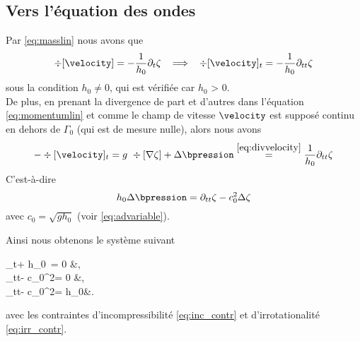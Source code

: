 \subsection{Vers l'équation des ondes}\label{subsec:eqtondes}
\noindent Par \eqref{eq:masslin} nous avons que
\begin{equation}
\div[\velocity]= -\frac{1}{h_0}\partial_t\zeta\hspace{3mm}\Longrightarrow\hspace{3mm} \div[\velocity]_t = -\frac{1}{h_0}\partial_{tt}\zeta\label{eq:divvelocity}
\end{equation}
sous la condition $h_0 \neq 0$, qui est vérifiée car $h_0$ > 0.\\
De plus, en prenant la divergence de part et d'autres dans l'équation \eqref{eq:momentumlin} et comme le champ de vitesse $\velocity$ est supposé continu en dehors de $\Gamma_0$ (qui est de mesure nulle), alors nous avons
\begin{equation*}
-\div[\velocity]_t = g~\div[\nabla\zeta] +\Delta\bpression \overset{\eqref{eq:divvelocity}}{=} \frac{1}{h_0}\partial_{tt}\zeta
\end{equation*}
C'est-à-dire
\begin{equation}
h_0 \Delta \bpression = \partial_{tt}\zeta - c_0^2\Delta\zeta
\end{equation}
avec $c_0 = \sqrt{gh_0}$ (voir \eqref{eq:advariable}).
\begin{refe}
	Ainsi nous obtenons le système suivant
	\begin{subnumcases}{}
		\partial_t\zeta + h_0~\div[\velocity] = 0 &,\label{eq:zetamass}\\
		\partial_{tt}\zeta - c_0^2\Delta\zeta = 0 &,\label{eq:zetaonde_w}\\
		\partial_{tt}\zeta - c_0^2\Delta\zeta = h_0\Delta\bpression &.\label{eq:zetaonde_b}
	\end{subnumcases}
	avec les contraintes d'incompressibilité \eqref{eq:inc_contr} et d'irrotationalité \eqref{eq:irr_contr}. 
\end{refe}
